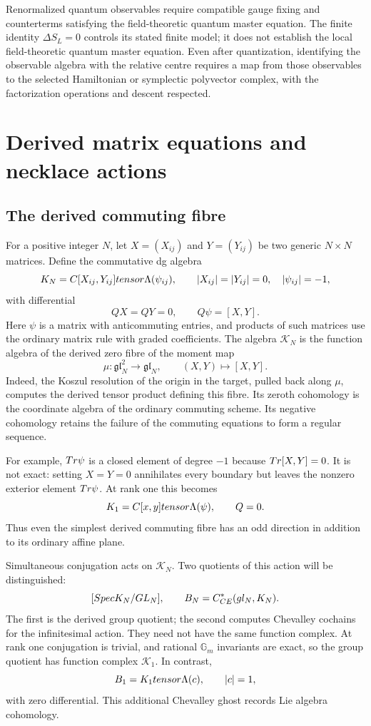 Renormalized quantum observables require compatible gauge fixing and
counterterms satisfying the field-theoretic quantum master equation.
The finite identity $\Delta S_L=0$ controls its stated finite model;
it does not establish the local field-theoretic quantum master equation.
Even after quantization, identifying the observable algebra with the
relative centre requires a map from those observables to the selected
Hamiltonian or symplectic polyvector complex, with the factorization
operations and descent respected.

\chapter{Derived matrix equations and necklace actions}
\section{The derived commuting fibre}
For a positive integer $N$, let $X=(X_{ij})$ and $Y=(Y_{ij})$ be
two generic $N\times N$ matrices.  Define the commutative dg algebra
\[
 K_N=
 C[X_{ij},Y_{ij}]tensor\Lambda(\psi_{ij}),
 \qquad |X_{ij}|=|Y_{ij}|=0,\quad |\psi_{ij}|=-1,
\]
with differential
\[
 QX=QY=0,\qquad Q\psi=[X,Y].
\]
Here $\psi$ is a matrix with anticommuting entries, and products of
such matrices use the ordinary matrix rule with graded coefficients.
The algebra $\mathcal K_N$ is the function algebra of the derived
zero fibre of the moment map
\[
 \mu:\mathfrak{gl}_N^2\longrightarrow\mathfrak{gl}_N,
 \qquad (X,Y)\longmapsto[X,Y].
\]
Indeed, the Koszul resolution of the origin in the target, pulled back
along $\mu$, computes the derived tensor product defining this fibre.
Its zeroth cohomology is the coordinate algebra of the ordinary
commuting scheme.
Its negative cohomology retains the failure of the commuting equations
to form a regular sequence.

For example, $Tr\psi$ is a closed element of degree $-1$ because
$Tr[X,Y]=0$.  It is not exact: setting $X=Y=0$ annihilates every
boundary but leaves the nonzero exterior element $Tr\psi$.
At rank one this becomes
\[
 K_1=C[x,y]tensor\Lambda(\psi),\qquad Q=0.
\]
Thus even the simplest derived commuting fibre has an odd direction
in addition to its ordinary affine plane.

Simultaneous conjugation acts on $\mathcal K_N$.
Two quotients of this action will be distinguished:
\[
 [SpecK_N/GL_N],
 \qquad
 B_N=C^*_{CE}(gl_N,K_N).
\]
The first is the derived group quotient; the second computes
Chevalley cochains for the infinitesimal action.
They need not have the same function complex.
At rank one conjugation is trivial, and rational $\mathbb G_m$
invariants are exact, so the group quotient has function complex
$\mathcal K_1$.  In contrast,
\[
 B_1=K_1tensor\Lambda(c),\qquad |c|=1,
\]
with zero differential.  This additional Chevalley ghost records
Lie algebra cohomology.

